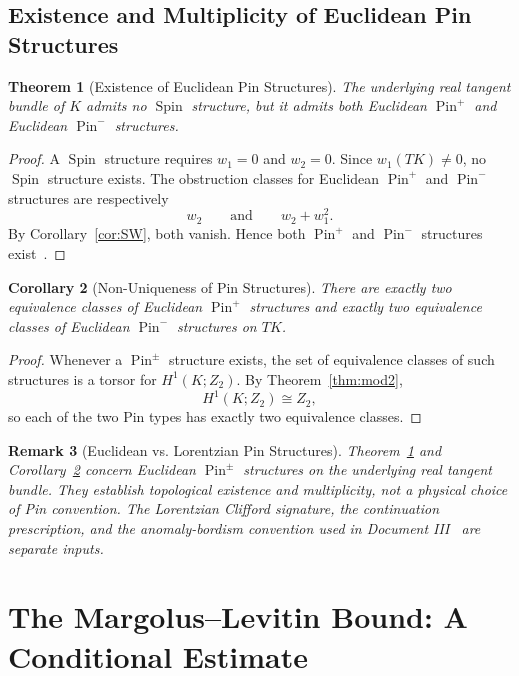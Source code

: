 \documentclass[11pt]{article}
\theoremstyle{canonmath}
\newtheorem{theorem}{Theorem}[section]
\newtheorem{corollary}[theorem]{Corollary}
\newtheorem{remark}[theorem]{Remark}
\theoremstyle{canonpostulate}
\theoremstyle{canonproposition}
\providecommand{\Klein}{\mathcal{K}}
\providecommand{\Ztwo}{\mathbb{Z}_2}
\providecommand{\Pin}{\operatorname{Pin}}
\providecommand{\Spin}{\operatorname{Spin}}
\def\mathbb#1{#1}%
\def\mathcal#1{#1}%
\begin{document}
\subsection{Existence and Multiplicity of Euclidean Pin Structures}

\begin{theorem}[Existence of Euclidean Pin Structures] \label{thm:pin}
The underlying real tangent bundle of $\Klein$ admits no $\Spin$ structure, but it admits both Euclidean $\Pin^+$ and Euclidean $\Pin^-$ structures.
\end{theorem}
\begin{proof}
A $\Spin$ structure requires $w_1=0$ and $w_2=0$. Since $w_1(T\Klein)\neq0$, no $\Spin$ structure exists. The obstruction classes for Euclidean $\Pin^+$ and $\Pin^-$ structures are respectively
\[
 w_2
 \qquad\text{and}\qquad
 w_2+w_1^2.
\]
By Corollary~\ref{cor:SW}, both vanish. Hence both $\Pin^+$ and $\Pin^-$ structures exist~\cite{kirby}.
\end{proof}

\begin{corollary}[Non-Uniqueness of Pin Structures] \label{cor:pinmultiplicity}
There are exactly two equivalence classes of Euclidean $\Pin^+$ structures and exactly two equivalence classes of Euclidean $\Pin^-$ structures on $T\Klein$.
\end{corollary}
\begin{proof}
Whenever a $\Pin^\pm$ structure exists, the set of equivalence classes of such structures is a torsor for $H^1(\Klein;\Ztwo)$. By Theorem~\ref{thm:mod2},
\[
H^1(\Klein;\Ztwo)\cong\Ztwo,
\]
so each of the two Pin types has exactly two equivalence classes.
\end{proof}

\begin{remark}[Euclidean vs. Lorentzian Pin Structures]
Theorem~\ref{thm:pin} and Corollary~\ref{cor:pinmultiplicity} concern Euclidean $\Pin^\pm$ structures on the underlying real tangent bundle. They establish topological existence and multiplicity, not a physical choice of Pin convention. The Lorentzian Clifford signature, the continuation prescription, and the anomaly-bordism convention used in Document III~\cite{CanonHow} are separate inputs.
\end{remark}

\section{The Margolus--Levitin Bound: A Conditional Estimate}
\end{document}
